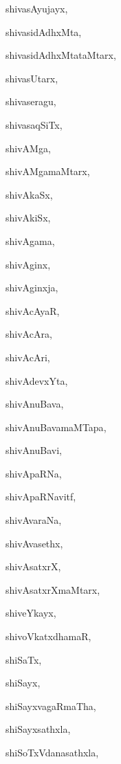 \begin{multicols}{2}
{shivasAyujayx}, \pageref{shivasAyujayx}

{shivasidAdhxMta}, \pageref{shivasidAdhxMta}

{shivasidAdhxMtataMtarx}, \pageref{shivasidAdhxMtataMtarx}

{shivasUtarx}, \pageref{shivasUtarx}

{shivaseragu}, \pageref{shivaseragu}

{shivasaqSiTx}, \pageref{shivasaqSiTx}

{shivAMga}, \pageref{shivAMga}

{shivAMgamaMtarx}, \pageref{shivAMgamaMtarx}

{shivAkaSx}, \pageref{shivAkaSx}

{shivAkiSx}, \pageref{shivAkiSx}

{shivAgama}, \pageref{shivAgama}

{shivAginx}, \pageref{shivAginx}

{shivAginxja}, \pageref{shivAginxja}

{shivAcAyaR}, \pageref{shivAcAyaR}

{shivAcAra}, \pageref{shivAcAra}

{shivAcAri}, \pageref{shivAcAri}

{shivAdevxYta}, \pageref{shivAdevxYta}

{shivAnuBava}, \pageref{shivAnuBava}

{shivAnuBavamaMTapa}, \pageref{shivAnuBavamaMTapa}

{shivAnuBavi}, \pageref{shivAnuBavi}

{shivApaRNa}, \pageref{shivApaRNa}

{shivApaRNavitf}, \pageref{shivApaRNavitf}

{shivAvaraNa}, \pageref{shivAvaraNa}

{shivAvasethx}, \pageref{shivAvasethx}

{shivAsatxrX}, \pageref{shivAsatxrX}

{shivAsatxrXmaMtarx}, \pageref{shivAsatxrXmaMtarx}

{shiveYkayx}, \pageref{shiveYkayx}

{shivoVkatxdhamaR}, \pageref{shivoVkatxdhamaR}

{shiSaTx}, \pageref{shiSaTx}

{shiSayx}, \pageref{shiSayx}

{shiSayxvagaRmaTha}, \pageref{shiSayxvagaRmaTha}

{shiSayxsathxla}, \pageref{shiSayxsathxla}

{shiSoTxVdanasathxla}, \pageref{shiSoTxVdanasathxla}


\end{multicols}
